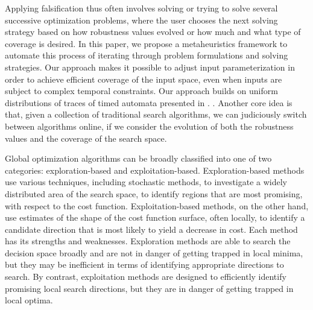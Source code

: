 Applying falsification thus often involves solving or trying to solve
several successive optimization problems, where the user chooses the
next solving strategy based on how robustness values evolved or how
much and what type of coverage is desired. In this paper, we propose a
metaheuristics framework to automate this process of iterating through
problem formulations and solving strategies. Our approach makes it
possible to adjust input parameterization in order to achieve
efficient coverage of the input space, even when inputs are subject to
complex temporal constraints. Our approach builds on uniform
distributions of traces of timed automata presented in \cite{}.
.
Another core idea is that, given a collection of traditional search
algorithms, we can judiciously switch between algorithms online, if we
consider the evolution of both the robustness values and the coverage
of the search space.

Global optimization algorithms can be broadly classified into one of two
categories: exploration-based and exploitation-based.
Exploration-based methods use various techniques, including stochastic
methods, to investigate a widely distributed area of the search space,
to identify regions that are most promising, with respect to the cost
function. Exploitation-based methods, on the other hand, use
estimates of the shape of the cost function surface, often locally, to
identify a candidate direction that is most likely to yield a decrease
in cost.  Each method has its strengths and weaknesses. Exploration
methods are able to search the decision space broadly and are not in
danger of getting trapped in local minima, but they may be inefficient
in terms of identifying appropriate directions to search.  By
contrast, exploitation methods are designed to efficiently identify
promising local search directions, but they are in danger of getting
trapped in local optima.


